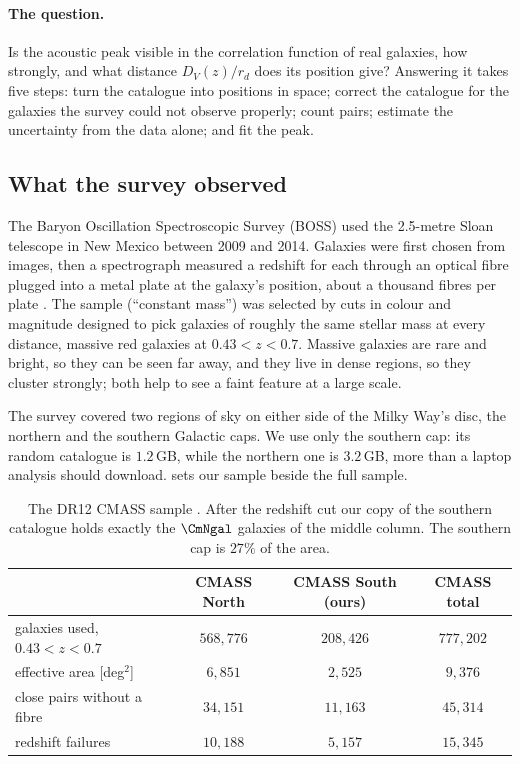\paragraph{The question.}
Is the acoustic peak visible in the correlation function of real galaxies, how
strongly, and what distance $D_V(z)/r_d$ does its position give? Answering it takes
five steps: turn the catalogue into positions
in space; correct the catalogue for the galaxies the survey could not observe
properly; count pairs; estimate the uncertainty from the data alone; and fit the
peak.

\subsection{What the survey observed}
\label{13c:sec:boss}

The Baryon Oscillation Spectroscopic Survey (BOSS) used the 2.5-metre Sloan
telescope in New Mexico between 2009 and 2014. Galaxies were first chosen from
images, then a spectrograph measured a redshift for each through an optical fibre
plugged into a metal plate at the galaxy's position, about a thousand fibres per
plate \cite{Reid2016}. The  sample (``constant mass'') was selected
by cuts in colour and magnitude designed to pick galaxies of roughly the same
stellar mass at every distance, massive red galaxies at $0.43<z<0.7$. Massive
galaxies are rare and bright, so they can be seen far away, and they live in dense
regions, so they cluster strongly; both help to see a faint feature at a large
scale.

The survey covered two regions of sky on either side of the Milky Way's disc, the
northern and the southern Galactic caps. We use only the southern cap: its random
catalogue is $1.2$\,GB, while the northern one is $3.2$\,GB, more than a laptop
analysis should download.  sets our sample beside the full
sample.

\begin{table}[htbp]
\centering
\small
\begin{tabular}{@{}lccc@{}}
\toprule
 & CMASS North & CMASS South (ours) & CMASS total\\\midrule
galaxies used, $0.43<z<0.7$ & $568{,}776$ & $208{,}426$ & $777{,}202$\\
effective area [deg$^2$] & $6{,}851$ & $2{,}525$ & $9{,}376$\\
close pairs without a fibre & $34{,}151$ & $11{,}163$ & $45{,}314$\\
redshift failures & $10{,}188$ & $5{,}157$ & $15{,}345$\\
\bottomrule
\end{tabular}
\caption{The DR12 CMASS sample . After the redshift cut
our copy of the southern catalogue holds exactly the $\CmNgal$ galaxies of the
middle column. The southern cap is $27\%$ of the area.}
\label{13c:tab:boss}
\end{table}

